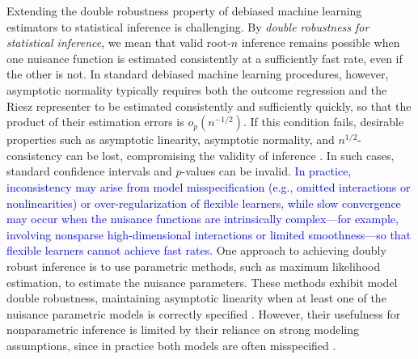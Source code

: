 \documentclass[11pt]{article}
\theoremstyle{plain}
\begin{document}
Extending the double robustness property of debiased machine learning
estimators to statistical inference is challenging. { \color{purple}By
\emph{double robustness for statistical inference}, we mean that valid
root-\(n\) inference remains possible when one nuisance function is estimated
consistently at a sufficiently fast rate, even if the other is not. In
standard debiased machine learning procedures, however, asymptotic normality
typically requires both the outcome regression and the Riesz representer to be
estimated consistently and sufficiently quickly, so that the product of their
estimation errors is \(o_p(n^{-1/2})\).} If this condition fails, desirable
properties such as asymptotic linearity, asymptotic normality, and
\(n^{1/2}\)-consistency can be lost, compromising the validity of inference
\citep{benkeser2017doubly}. In such
cases, standard confidence intervals and \(p\)-values can be invalid.
\textcolor{blue}{In practice, inconsistency may arise from model
misspecification (e.g., omitted interactions or nonlinearities) or
over-regularization of flexible learners, while slow convergence may occur when
the nuisance functions are intrinsically complex---for example, involving
nonsparse high-dimensional interactions or limited smoothness---so that
flexible learners cannot achieve fast rates.} One approach to achieving doubly
robust inference is to use parametric methods, such as maximum likelihood
estimation, to estimate the nuisance parameters. These methods exhibit model
double robustness, maintaining asymptotic linearity when at least one of the
nuisance parametric models is correctly specified
\citep{vermeulen2015bias, vermeulen2016data, shook2025double}. However, their
usefulness for nonparametric inference is limited by their reliance on strong
modeling assumptions, since in practice both models are often misspecified
\citep{kang2007demystifying}.
 
 
 
\end{document}
